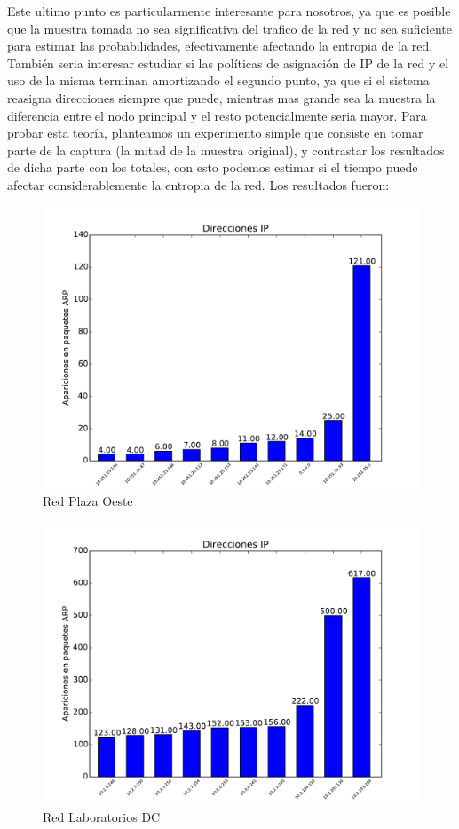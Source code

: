 Este ultimo punto es particularmente interesante para nosotros, ya que es posible que la muestra tomada no sea significativa del trafico de la red y no sea suficiente para estimar las probabilidades, efectivamente afectando la entropia de la red. También seria interesar estudiar si las políticas de asignación de IP de la red y el uso de la misma terminan amortizando el segundo punto, ya que si el sistema reasigna direcciones siempre que puede, mientras mas grande sea la muestra la diferencia entre el nodo principal y el resto potencialmente seria mayor. Para probar esta teoría, planteamos un experimento simple que consiste en tomar parte de la captura (la mitad de la muestra original), y contrastar los resultados de dicha parte con los totales, con esto podemos estimar si el tiempo puede afectar considerablemente la entropia de la red. Los resultados fueron:

\begin{figure}[H]
\begin{center}
\includegraphics[width=0.8\columnwidth]{graficos/plaza_parcial_s2.pdf}
\caption{Red Plaza Oeste}
\end{center}
\end{figure}

\begin{figure}[H]
\begin{center}
\includegraphics[width=0.8\columnwidth]{graficos/dc_parcial_s2.pdf}
\caption{Red Laboratorios DC}
\end{center}
\end{figure}

